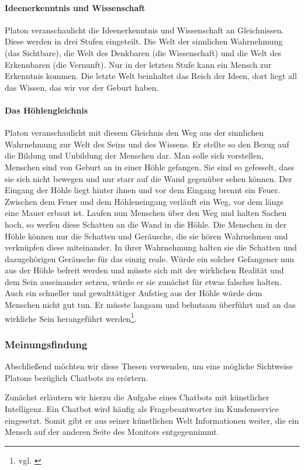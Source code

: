 \paragraph{Ideenerkenntnis und Wissenschaft}
Platon veranschaulicht die Ideenerkenntnis und Wissenschaft an Gleichnissen. Diese werden in drei Stufen eingeteilt. Die Welt der sinnlichen Wahrnehmung (das Sichtbare), die Welt des Denkbaren (die Wissenschaft) und die Welt des Erkennbaren (die Vernunft). Nur in der letzten Stufe kann ein Mensch zur Erkenntnis kommen. Die letzte Welt beinhaltet das Reich der Ideen, dort liegt all das Wissen, das wir vor der Geburt haben.

\paragraph{Das Höhlengleichnis}
Platon veranschaulicht mit diesem Gleichnis den Weg aus der sinnlichen Wahrnehmung zur Welt des Seins und des Wissens. Er stellte so den Bezug auf die Bildung und Unbildung der Menschen dar.
Man solle sich vorstellen,  Menschen sind von Geburt an in einer Höhle gefangen. Sie sind so gefesselt, dass sie sich nicht bewegen und nur starr auf die Wand gegenüber sehen können. Der Eingang der Höhle liegt hinter ihnen und vor dem Eingang brennt ein Feuer. Zwischen dem Feuer und dem Höhleneingang verläuft ein Weg, vor dem längs eine Mauer erbaut ist. Laufen nun Menschen über den Weg und halten Sachen hoch, so werfen diese Schatten an die Wand in die Höhle. Die Menschen in der Höhle können nur die Schatten und Geräusche, die sie hören Wahrnehmen und verknüpfen diese miteinander. In ihrer Wahrnehmung halten sie die Schatten und dazugehörigen Geräusche für das einzig reale. Würde ein solcher Gefangener nun aus der Höhle befreit werden und müsste sich mit der wirklichen Realität und dem Sein auseinander setzen, würde er sie zunächst für etwas falsches halten. Auch ein schneller und gewalttätiger Aufstieg aus der Höhle würde dem Menschen nicht gut tun. Er müsste langsam und behutsam überführt und an das wirkliche Sein herangeführt werden\footnote{vgl. \cite{Politeia} }.    
	
\subsubsection{Meinungsfindung}
Abschließend möchten wir diese Thesen verwenden, um eine mögliche Sichtweise Platons bezüglich Chatbots zu erörtern.

Zunächst erläutern wir hierzu die Aufgabe eines Chatbots mit künstlicher Intelligenz. Ein Chatbot wird häufig als Fragebeantworter im Kundenservice eingesetzt. Somit gibt er aus seiner künstlichen Welt Informationen weiter, die ein Mensch auf der anderen Seite des Monitors entgegennimmt.

